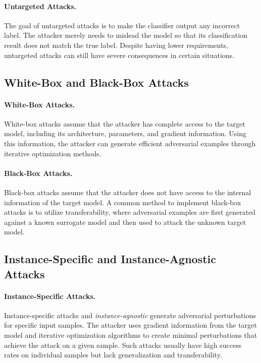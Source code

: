 \paragraph{Untargeted Attacks.} The goal of untargeted attacks is to make the classifier output any incorrect label. The attacker merely needs to mislead the model so that its classification result does not match the true label. Despite having lower requirements, untargeted attacks can still have severe consequences in certain situations.

\subsection{White-Box and Black-Box Attacks}

\paragraph{White-Box Attacks.} White-box attacks assume that the attacker has complete access to the target model, including its architecture, parameters, and gradient information. Using this information, the attacker can generate efficient adversarial examples through iterative optimization methods.

\paragraph{Black-Box Attacks.} Black-box attacks assume that the attacker does not have access to the internal information of the target model. A common method to implement black-box attacks is to utilize transferability, where adversarial examples are first generated against a known surrogate model and then used to attack the unknown target model.

\subsection{Instance-Specific and Instance-Agnostic Attacks}

\paragraph{Instance-Specific Attacks.} Instance-specific attacks \cite{dong2018boosting, gao2021feature, eykholt2018robust, xiong2022stochastic, wang2021enhancing, lu2020enhancing, li2020yet} and \textit{instance-agnostic} generate adversarial perturbations for specific input samples. The attacker uses gradient information from the target model and iterative optimization algorithms to create minimal perturbations that achieve the attack on a given sample. Such attacks usually have high success rates on individual samples but lack generalization and transferability.

